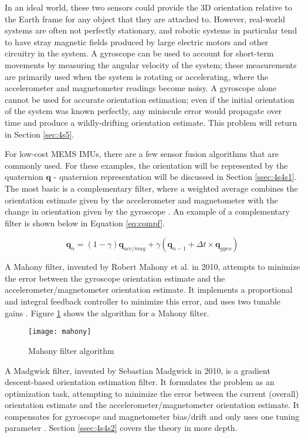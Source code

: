 \documentclass[12pt,a4paper]{report}
\begin{document}
In an ideal world, these two sensors could provide the 3D orientation relative to the Earth frame for any object that they are attached to. However, real-world systems are often not perfectly stationary, and robotic systems in particular tend to have stray magnetic fields produced by large electric motors and other circuitry in the system. A gyroscope can be used to account for short-term movements by measuring the angular velocity of the system; these measurements are primarily used when the system is rotating or accelerating, where the accelerometer and magnetometer readings become noisy. A gyroscope alone cannot be used for accurate orientation estimation; even if the initial orientation of the system was known perfectly, any miniscule error would propagate over time and produce a wildly-drifting orientation estimate. This problem will return in Section \ref{sec:4s5}.

For low-cost MEMS IMUs, there are a few sensor fusion algorithms that are commonly used. For these examples, the orientation will be represented by the quaternion \(\mathbf{q}\) - quaternion representation will be discussed in Section \ref{ssec:4s4s1}. The most basic is a complementary filter, where a weighted average combines the orientation estimate given by the accelerometer and magnetometer with the change in orientation given by the gyroscope \cite{sfcomp}. An example of a complementary filter is shown below in Equation \ref{eq:compf}.

\begin{equation} \label{eq:compf}
	\mathbf{q}_n = (1 - \gamma) \mathbf{q}_{acc/mag} + \gamma (\mathbf{q}_{n-1} + \Delta t \times \mathbf{q}_{gyro})
\end{equation}

A Mahony filter, invented by Robert Mahony et al. in 2010, attempts to minimize the error between the gyroscope orientation estimate and the accelerometer/magnetometer orientation estimate. It implements a proportional and integral feedback controller to minimize this error, and uses two tunable gains \cite{mahony}. Figure \ref{fig:mahony} shows the algorithm for a Mahony filter.

\begin{figure}[htbp]
	\centering
	\texttt{[image: mahony]}
	\caption{Mahony filter algorithm \cite{ekfmadmah}}
	\label{fig:mahony}
\end{figure}

A Madgwick filter, invented by Sebastian Madgwick in 2010, is a gradient descent-based orientation estimation filter. It formulates the problem as an optimization task, attempting to minimize the error between the current (overall) orientation estimate and the accelerometer/magnetometer orientation estimate. It compensates for gyroscope and magnetometer bias/drift and only uses one tuning parameter \cite{madgwick}. Section \ref{ssec:4s4s2} covers the theory in more depth.
\end{document}
